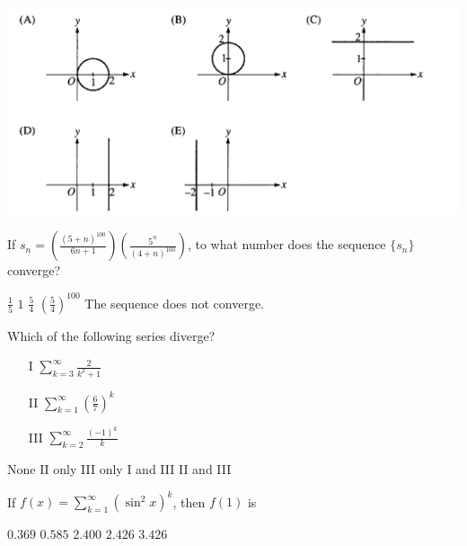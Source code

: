 \begin{questions}
    \includegraphics[scale=0.7]{BC5.png}    

\question[2] If $s_n =
(\frac{(5+n)^{100}}{6{n+1}})(\frac{5^n}{(4+n)^{100}})$, to what number
does the sequence $\{s_n\}$ converge?

    \begin{oneparchoices}
    \CorrectChoice $\frac{1}{5}$
    \choice $1$
    \choice $\frac{5}{4}$
    \choice $(\frac{5}{4})^{100}$
    \choice The sequence does not converge.
    \end{oneparchoices}

\question[2] Which of the following series diverge?
            
    \begin{enumerate}
    \item[I] $\sum_{k = 3}^\infty \frac{2}{k^2 + 1}$
    \item[II] $\sum_{k = 1}^\infty (\frac{6}{7})^k$
    \item[III] $\sum_{k = 2}^\infty \frac{(-1)^k}{k}$
    \end{enumerate}

    \begin{oneparchoices}
    \CorrectChoice None
    \choice II only
    \choice III only
    \choice I and III
    \choice II and III
    \end{oneparchoices} 

\question[2] If $f(x) = \sum_{k = 1}^\infty (\sin^2 x)^k$, then $f(1)$ is

    \begin{oneparchoices}
    \choice $0.369$
    \choice $0.585$
    \choice $2.400$
    \CorrectChoice $2.426$
    \choice $3.426$
    \end{oneparchoices}


\end{questions}
